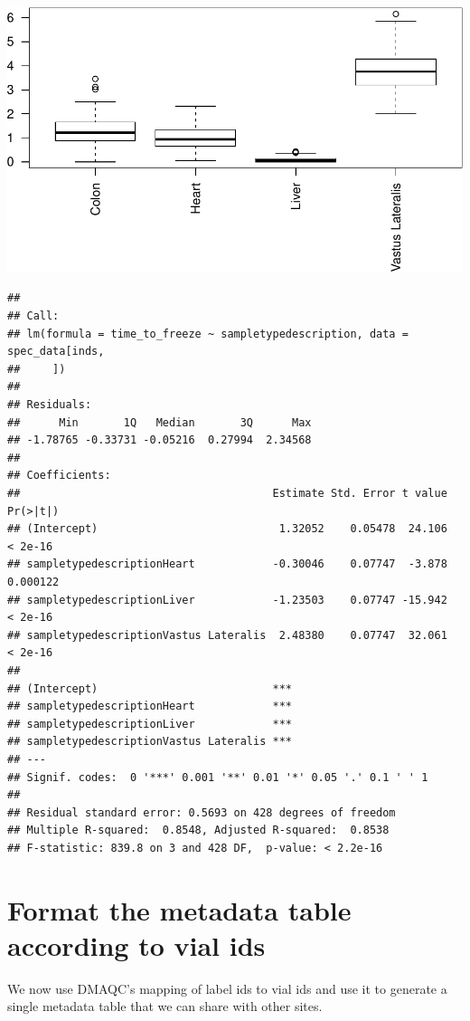 \documentclass[]{article}
\begin{document}
\begin{center}\includegraphics[width=0.5\linewidth,height=0.5\textheight]{pheno_csv_files_analysis_files/figure-latex/unnamed-chunk-5-2} \end{center}

\begin{verbatim}
## 
## Call:
## lm(formula = time_to_freeze ~ sampletypedescription, data = spec_data[inds, 
##     ])
## 
## Residuals:
##      Min       1Q   Median       3Q      Max 
## -1.78765 -0.33731 -0.05216  0.27994  2.34568 
## 
## Coefficients:
##                                       Estimate Std. Error t value Pr(>|t|)
## (Intercept)                            1.32052    0.05478  24.106  < 2e-16
## sampletypedescriptionHeart            -0.30046    0.07747  -3.878 0.000122
## sampletypedescriptionLiver            -1.23503    0.07747 -15.942  < 2e-16
## sampletypedescriptionVastus Lateralis  2.48380    0.07747  32.061  < 2e-16
##                                          
## (Intercept)                           ***
## sampletypedescriptionHeart            ***
## sampletypedescriptionLiver            ***
## sampletypedescriptionVastus Lateralis ***
## ---
## Signif. codes:  0 '***' 0.001 '**' 0.01 '*' 0.05 '.' 0.1 ' ' 1
## 
## Residual standard error: 0.5693 on 428 degrees of freedom
## Multiple R-squared:  0.8548, Adjusted R-squared:  0.8538 
## F-statistic: 839.8 on 3 and 428 DF,  p-value: < 2.2e-16
\end{verbatim}

\section{Format the metadata table according to vial
ids}\label{format-the-metadata-table-according-to-vial-ids}

We now use DMAQC's mapping of label ids to vial ids and use it to
generate a single metadata table that we can share with other sites.
\end{document}
